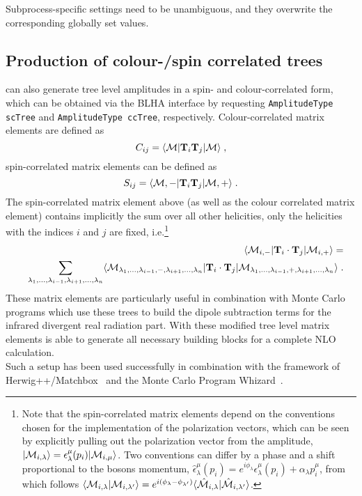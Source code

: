 Subprocess-specific settings need to be unambiguous, and they overwrite 
the corresponding globally set values.

\subsection{Production of colour-/spin correlated trees}

\gosam{} can also generate  tree level amplitudes in a spin- and colour-correlated form, which can be obtained via the BLHA interface by requesting \texttt{AmplitudeType scTree} and \texttt{AmplitudeType ccTree}, respectively. Colour-correlated matrix elements are defined as
\begin{equation}
 C_{ij}=\langle{{\cal M}}|\textbf{T}_{i}\textbf{T}_j |{{\cal M}}\rangle\;,
\end{equation}
spin-correlated matrix elements can be defined as
\begin{equation}
 S_{ij}=\langle{{\cal M},-}|\textbf{T}_{i}\textbf{T}_j |{{\cal M},+}\rangle\;.
\end{equation}
The spin-correlated matrix element above (as well as the colour correlated matrix element) contains implicitly
the sum over all other helicities, only the helicities with the indices $i$ and $j$ are fixed, i.e.\footnote{Note that the spin-correlated matrix elements depend on the conventions chosen for the implementation of the polarization vectors, which can be seen by explicitly pulling out the polarization vector from the amplitude, $|{\cal M}_{i,\lambda}\rangle=\epsilon_\lambda^\mu(p_i)|{\cal M}_{i,\mu}\rangle$. Two conventions can differ by a phase and a shift proportional to the bosons momentum, $\hat{\epsilon}_\lambda^{\mu}(p_i)=e^{i\phi_\lambda}\epsilon_\lambda^\mu(p_i)+\alpha_\lambda p_i^\mu$, from which follows $\langle{\cal M}_{i,\lambda}|{\cal M}_{i,\lambda'}\rangle=e^{i(\phi_{\lambda}-\phi_{\lambda'})}\langle\hat{{\cal M}}_{i,\lambda}|\hat{{\cal M}}_{i,\lambda'}\rangle$.}
 \begin{eqnarray}
&&\langle {\cal M}_{i,-} |{\mathbf T}_i\cdot {\mathbf T}_j |{\cal M}_{i,+}\rangle =\\
&&\sum_{\lambda_1,...,\lambda_{i-1},\lambda_{i+1},...,\lambda_n}
\langle {\cal M}_{\lambda_1,...,\lambda_{i-1},-,\lambda_{i+1},...,\lambda_n} |
{\mathbf T}_i\cdot {\mathbf T}_j | 
{\cal M}_{\lambda_1,...,\lambda_{i-1},+,\lambda_{i+1},...,\lambda_n}\rangle \;. \nonumber
\end{eqnarray}
These matrix elements are particularly useful in combination with Monte Carlo programs 
which use these trees to build the dipole subtraction terms for the infrared divergent 
real radiation part. With these modified tree level matrix elements \gosam{} is able to generate
all necessary building blocks for a complete NLO calculation.\\
Such a setup has been used successfully in combination with the framework of 
{\sc Herwig++/Matchbox}~\cite{LesHouches2013,Bellm:2013lba,Platzer:2011bc} and the Monte Carlo Program Whizard~\cite{Kilian:2007gr,Moretti:2001zz,Stienemeier:2021cse,Braun:2025hvr}.

